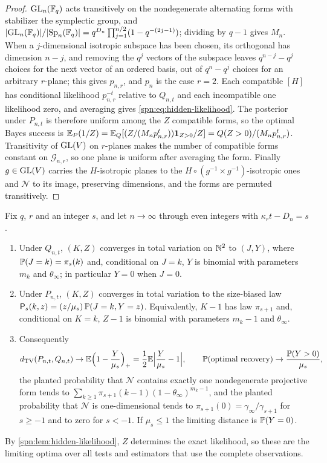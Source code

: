 \begin{proof}
$\operatorname{GL}_n(\mathbb{F}_q)$ acts transitively on the nondegenerate alternating forms with stabilizer the
symplectic group, and $\lvert\operatorname{GL}_n(\mathbb{F}_q)\rvert/\lvert\operatorname{Sp}_n(\mathbb{F}_q)\rvert=q^{D_n}\prod_{j=1}^{n/2}(1-q^{-(2j-1)})$;
dividing by $q-1$ gives $M_n$. When a $j$-dimensional isotropic subspace has been chosen, its
orthogonal has dimension $n-j$, and removing the $q^j$ vectors of the subspace leaves
$q^{n-j}-q^j$ choices for the next vector of an ordered basis, out of $q^n-q^j$ choices for an
arbitrary $r$-plane; this gives $p_{n,r}$, and $p_n$ is the case $r=2$. Each compatible $[H]$ has
conditional likelihood $p_{n,r}^{-t}$ relative to $Q_{n,t}$ and each incompatible one likelihood
zero, and averaging gives \eqref{spn:eq:hidden-likelihood}. The posterior under $P_{n,t}$ is
therefore uniform among the $Z$ compatible forms, so the optimal Bayes success is
$\mathbb{E}_P(1/Z)=\mathbb{E}_Q[(Z/(M_np_{n,r}^t))\mathbf 1_{Z>0}/Z]=Q(Z>0)/(M_np_{n,r}^t)$. Transitivity of
$\operatorname{GL}(V)$ on $r$-planes makes the number of compatible forms constant on $\mathcal G_{n,r}$, so one
plane is uniform after averaging the form. Finally $g\in\operatorname{GL}(V)$ carries the $H$-isotropic planes to
the $H\circ(g^{-1}\times g^{-1})$-isotropic ones and $\mathcal N$ to its image, preserving dimensions,
and the forms are permuted transitively.
\end{proof}

\begin{theorem}\label{spn:thm:hidden-window}
Fix $q$, $r$ and an integer $s$, and let $n\to\infty$ through even integers with
$\kappa_rt-D_n=s$.
\begin{enumerate}
\item Under $Q_{n,t}$, $(K,Z)$ converges in total variation on $\mathbb{N}^2$ to $(J,Y)$, where
$\mathbb{P}(J=k)=\pi_s(k)$ and, conditional on $J=k$, $Y$ is binomial with parameters $m_k$ and
$\theta_\infty$; in particular $Y=0$ when $J=0$.
\item Under $P_{n,t}$, $(K,Z)$ converges in total variation to the size-biased law
$\mathsf P_s(k,z)=(z/\mu_s)\,\mathbb{P}(J=k,Y=z)$. Equivalently, $K-1$ has law $\pi_{s+1}$ and,
conditional on $K=k$, $Z-1$ is binomial with parameters $m_k-1$ and $\theta_\infty$.
\item Consequently
\[
 d_{\mathrm{TV}}(P_{n,t},Q_{n,t})\to\mathbb{E}\Bigl(1-\frac Y{\mu_s}\Bigr)_+=\frac12\mathbb{E}\Bigl|\frac Y{\mu_s}-1\Bigr|,\qquad
 \mathbb{P}(\text{optimal recovery})\to\frac{\mathbb{P}(Y>0)}{\mu_s},
\]
the planted probability that $\mathcal N$ contains exactly one nondegenerate projective form tends
to $\sum_{k\ge1}\pi_{s+1}(k-1)(1-\theta_\infty)^{m_k-1}$, and the planted probability that
$\mathcal N$ is one-dimensional tends to $\pi_{s+1}(0)=\gamma_\infty/\gamma_{s+1}$ for $s\ge-1$ and to
zero for $s<-1$. If $\mu_s\le1$ the limiting distance is $\mathbb{P}(Y=0)$.
\end{enumerate}
By \cref{spn:lem:hidden-likelihood}, $Z$ determines the exact likelihood, so these are the limiting
optima over all tests and estimators that use the complete observations.
\end{theorem}

